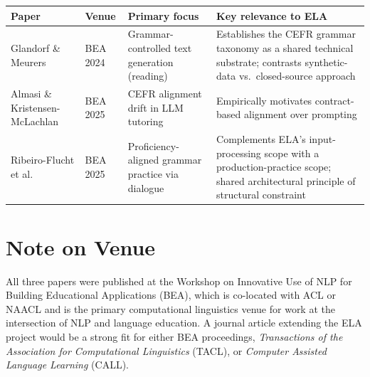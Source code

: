 \documentclass[12pt,a4paper]{article}
\begin{document}
\begin{table}[h]
  \centering
  \begin{tabularx}{\textwidth}{p{3.8cm}p{1.8cm}p{2.4cm}X}
    \toprule
    \textbf{Paper} & \textbf{Venue} & \textbf{Primary focus} & \textbf{Key relevance to ELA} \\
    \midrule
    Glandorf \& Meurers & BEA 2024 & Grammar-controlled text generation (reading) & Establishes the CEFR grammar taxonomy as a shared technical substrate; contrasts synthetic-data vs.\ closed-source approach \\
    \midrule
    Almasi \& Kristensen-McLachlan & BEA 2025 & CEFR alignment drift in LLM tutoring & Empirically motivates contract-based alignment over prompting \\
    \midrule
    Ribeiro-Flucht et al. & BEA 2025 & Proficiency-aligned grammar practice via dialogue & Complements ELA's input-processing scope with a production-practice scope; shared architectural principle of structural constraint \\
    \bottomrule
  \end{tabularx}
\end{table}

\section*{Note on Venue}

All three papers were published at the Workshop on Innovative Use of NLP for Building Educational Applications (BEA), which is co-located with ACL or NAACL and is the primary computational linguistics venue for work at the intersection of NLP and language education. A journal article extending the ELA project would be a strong fit for either BEA proceedings, \textit{Transactions of the Association for Computational Linguistics} (TACL), or \textit{Computer Assisted Language Learning} (CALL).
\end{document}
